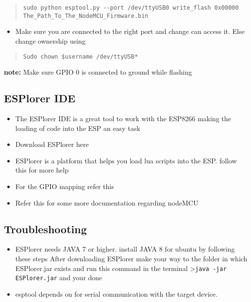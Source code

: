 \documentclass[16pt]{article}
\begin{document}
\begin{quote}
\texttt{sudo python esptool.py -{}-port /dev/ttyUSB0  write\_flash 0x00000 The\_Path\_To\_The\_NodeMCU\_Firmware.bin}
\end{quote}

\begin{itemize}

\item
  Make sure you are connected to the right port and change can access
  it. Else change ownership using
\end{itemize}

\begin{quote}
\texttt{Sudo chown \$username /dev/ttyUSB*}
\end{quote}

\textbf{note:} Make sure GPIO 0 is connected to ground while flashing
\vspace{0.5cm}

\subsection{ESPlorer IDE}

\begin{itemize}

\item
  The ESPlorer IDE is a great tool to work with the ESP8266 making the
  loading of code into the ESP an easy task
\item
  Download ESPlorer here
\item
  ESPlorer is a platform that helps you load lua scripts into the ESP.
  follow this for more help
\item
  For the GPIO mapping refer this
\item
  Refer this for some more documentation regarding nodeMCU
\end{itemize}

\subsection{Troubleshooting}

\begin{itemize}

\item
  ESPlorer needs JAVA 7 or higher. install JAVA 8 for ubuntu by
  following these steps
  After downloading ESPlorer make your way to the folder in which
  ESPlorer.jar exists and run this command in the terminal
  \textgreater{}\texttt{java -jar ESPlorer.jar} and your done
\item
  esptool depends on %
  for serial communication with the target device.
\end{itemize}
\end{document}
